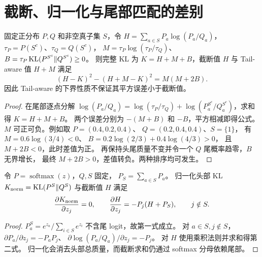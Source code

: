 \section{截断、归一化与尾部匹配的差别}
\begin{proposition}
\label{prop:truncation-mse}
固定正分布 $P,Q$ 和非空真子集 $S$，令
$H=\sum_{a\in S}P_a\log(P_a/Q_a)$，
$\tau_P=P(S^c)$、$\tau_Q=Q(S^c)$，
$M=\tau_P\log(\tau_P/\tau_Q)$、
$B=\tau_P\operatorname{KL}(P^{S^c}\Vert Q^{S^c})\ge0$。
则完整 KL 为 $K=H+M+B$，截断值 $H$ 与 Tail-aware 值 $H+M$ 满足
\begin{equation}
(H-K)^2-(H+M-K)^2=M(M+2B).
\end{equation}
因此 Tail-aware 的下界性质不保证其平方误差小于截断值。
\end{proposition}
\begin{proof}
在尾部逐点分解
$\log(P_a/Q_a)=\log(\tau_P/\tau_Q)+
\log(P_a^{S^c}/Q_a^{S^c})$，求和得 $K=H+M+B$。
两个误差分别为 $-(M+B)$ 和 $-B$，平方相减即得公式。
$M$ 可正可负。例如取 $P=(0.4,0.2,0.4)$、
$Q=(0.2,0.4,0.4)$、$S=\{1\}$，
有 $M=0.6\log(3/4)<0$、
$B=0.2\log(2/3)+0.4\log(4/3)>0$，
且 $M+2B<0$，此时差值为正。
再保持头尾质量不变并令一个 $Q$ 尾概率趋零，$B$ 无界增长，
最终 $M+2B>0$，差值转负。两种排序均可发生。
\end{proof}

\begin{proposition}
\label{prop:tail-logit}
令 $P=\operatorname{softmax}(z)$，$Q,S$ 固定，
$P_S=\sum_{a\in S}P_a$。
归一化头部 KL $K_{\rm norm}=\operatorname{KL}(P^S\Vert Q^S)$ 与截断值 $H$ 满足
\begin{equation}
\frac{\partial K_{\rm norm}}{\partial z_j}=0,\qquad
\frac{\partial H}{\partial z_j}=-P_j(H+P_S),\qquad j\notin S.
\end{equation}
\end{proposition}
\begin{proof}
$P_a^S=e^{z_a}/\sum_{i\in S}e^{z_i}$ 不含尾 logit，故第一式成立。
对 $a\in S,j\notin S$，
$\partial P_a/\partial z_j=-P_aP_j$、
$\partial\log(P_a/Q_a)/\partial z_j=-P_j$。
对 $H$ 使用乘积法则并求和得第二式。
归一化会消去头部总质量，而截断求和仍通过 softmax 分母依赖尾部。
\end{proof}

